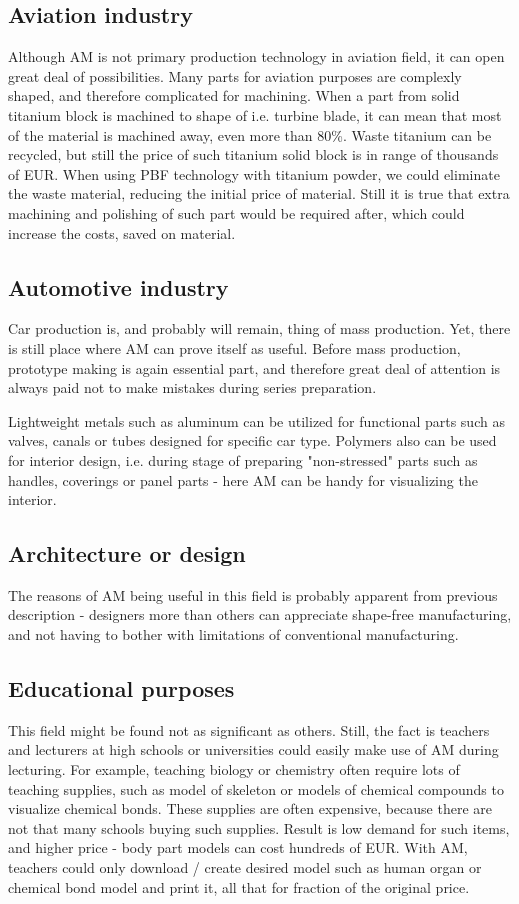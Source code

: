 \documentclass[a4paper, twoside, 11pt]{report}
\begin{document}
\subsection{Aviation industry}
Although AM is not primary production technology in aviation field, it can open great deal of possibilities. Many parts for aviation purposes are complexly shaped, and therefore complicated for machining. When a part from solid titanium block is machined to shape of i.e. turbine blade, it can mean that most of the material is machined away, even more than 80\%. Waste titanium can be recycled, but still the price of such titanium solid block is in range of thousands of EUR. When using PBF technology with titanium powder, we could eliminate the waste material, reducing the initial price of material. Still it is true that extra machining and polishing of such part would be required after, which could increase the costs, saved on material.
\subsection{Automotive industry}
Car production is, and probably will remain, thing of mass production. Yet, there is still place where AM can prove itself as useful. Before mass production, prototype making is again essential part, and therefore great deal of attention is always paid not to make mistakes during series preparation.

	Lightweight metals such as aluminum can be utilized for functional parts such as valves, canals or tubes designed for specific car type. Polymers also can be used for interior design, i.e. during stage of preparing "non-stressed" parts such as handles, coverings or panel parts - here AM can be handy for visualizing the interior.
\subsection{Architecture or design}
The reasons of AM being useful in this field is probably apparent from previous description - designers more than others can appreciate shape-free manufacturing, and not having to bother with limitations of conventional manufacturing. 
\subsection{Educational purposes}
This field might be found not as significant as others. Still, the fact is teachers and lecturers at high schools or universities could easily make use of AM during lecturing. For example, teaching biology or chemistry often require lots of teaching supplies, such as model of skeleton or models of chemical compounds to visualize chemical bonds. These supplies are often expensive, because there are not that many schools buying such supplies. Result is low demand for such items, and higher price - body part models can cost hundreds of EUR. With AM, teachers could only download / create desired model such as human organ or chemical bond model and print it, all that for fraction of the original price.
%
%
%
\end{document}
